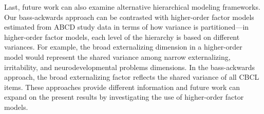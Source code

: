 \documentclass[
  20pt,
  number,
  preprint,
  3p,
  twocolumn]{elsarticle}
\begin{document}
Last, future work can also examine alternative hierarchical modeling
frameworks. Our bass-ackwards approach can be contrasted with
higher-order factor models estimated from ABCD study data
\citep[e.g.,][]{clark2023} in terms of how variance is partitioned---in
higher-order factor models, each level of the hierarchy is based on
different variances. For example, the broad externalizing dimension in a
higher-order model would represent the shared variance among narrow
externalizing, irritability, and neurodevelopmental problems dimensions.
In the bass-ackwards approach, the broad externalizing factor reflects
the shared variance of all CBCL items. These approaches provide
different information and future work can expand on the present results
by investigating the use of higher-order factor models.


  
\end{document}
